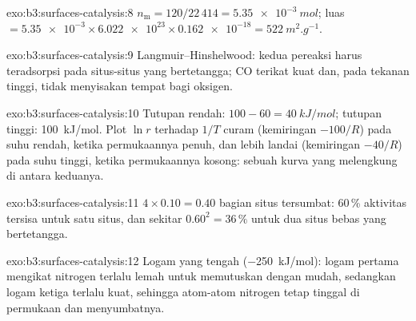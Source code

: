 \begin{solution}{exo:b3:surfaces-catalysis:8}
$n_{\mathrm m} = 120/22\,414 = \qty{5.35e-3}{mol}$; luas $= \num{5.35e-3} \times \num{6.022e23} \times \num{0.162e-18} =
\qty{522}{m^2.g^{-1}}$.
\end{solution}

\begin{solution}{exo:b3:surfaces-catalysis:9}
Langmuir--Hinshelwood: kedua pereaksi harus teradsorpsi pada situs-situs yang
bertetangga; CO terikat kuat dan, pada tekanan tinggi, tidak menyisakan tempat
bagi oksigen.
\end{solution}

\begin{solution}{exo:b3:surfaces-catalysis:10}
Tutupan rendah: $100 - 60 = \qty{40}{kJ/mol}$; tutupan tinggi: \qty{100}{kJ/mol}. Plot $\ln r$
terhadap $1/T$ curam (kemiringan $-100/R$) pada suhu rendah, ketika permukaannya
penuh, dan lebih landai (kemiringan $-40/R$) pada suhu tinggi, ketika permukaannya
kosong: sebuah kurva yang melengkung di antara keduanya.
\end{solution}

\begin{solution}{exo:b3:surfaces-catalysis:11}
$4 \times 0.10 = 0.40$ bagian situs tersumbat: 60\,\% aktivitas tersisa untuk satu
situs, dan sekitar $0.60^2 = 36\,\%$ untuk dua situs bebas yang bertetangga.
\end{solution}

\begin{solution}{exo:b3:surfaces-catalysis:12}
Logam yang tengah (\qty{-250}{kJ/mol}): logam pertama mengikat nitrogen terlalu lemah untuk memutuskan 
dengan mudah, sedangkan logam ketiga terlalu kuat, sehingga atom-atom nitrogen
tetap tinggal di permukaan dan menyumbatnya.
\end{solution}

